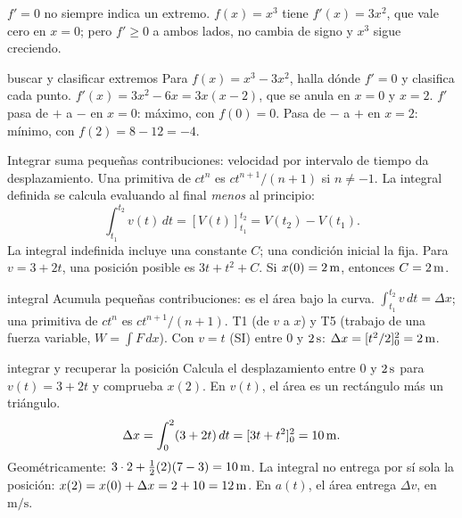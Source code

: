 \documentclass[11pt,a4paper]{article}
\begin{document}
\begin{warnbox}
$f'=0$ no siempre indica un extremo. $f(x)=x^3$ tiene $f'(x)=3x^2$, que vale cero en
$x=0$; pero $f'\ge0$ a ambos lados, no cambia de signo y $x^3$ sigue creciendo.
\end{warnbox}

\begin{exercisebox}{buscar y clasificar extremos}
Para $f(x)=x^3-3x^2$, halla d\'onde $f'=0$ y clasifica cada punto.
\solutionblock
$f'(x)=3x^2-6x=3x(x-2)$, que se anula en $x=0$ y $x=2$.
$f'$ pasa de $+$ a $-$ en $x=0$: m\'aximo, con $f(0)=0$.
Pasa de $-$ a $+$ en $x=2$: m\'inimo, con $f(2)=8-12=-4$.
\end{exercisebox}

Integrar suma peque\~nas contribuciones: velocidad por intervalo de tiempo da
desplazamiento. Una primitiva de $ct^n$ es $ct^{n+1}/(n+1)$ si $n\ne-1$.
La integral definida se calcula evaluando al final \emph{menos} al principio:
\[
\int_{t_1}^{t_2}v(t)\,dt=[V(t)]_{t_1}^{t_2}=V(t_2)-V(t_1).
\]
La integral indefinida incluye una constante $C$; una condici\'on inicial la fija.
Para $v=3+2t$, una posici\'on posible es $3t+t^2+C$.
Si $x(0)=2\,\mathrm{m}$, entonces $C=2\,\mathrm{m}$.

\begin{toolbox}{integral}
 Acumula peque\~nas contribuciones: es el \'area bajo la curva.
 $\int_{t_1}^{t_2}v\,dt=\Delta x$; una primitiva de $ct^n$ es
$ct^{n+1}/(n+1)$.
 T1 (de $v$ a $x$) y T5 (trabajo de una fuerza variable,
$W=\int F\,dx$).
 Con $v=t$ (SI) entre $0$ y $2\,\mathrm{s}$: $\Delta x=[t^2/2]_0^2=2\,\mathrm{m}$.
\end{toolbox}

\begin{examplebox}{integrar y recuperar la posici\'on}
 Calcula el desplazamiento entre $0$ y $2\,\mathrm{s}$ para
$v(t)=3+2t$ y comprueba $x(2)$.
\solutionblock
{} En $v(t)$, el \'area es un rect\'angulo m\'as un tri\'angulo.
\[
\Delta x=\int_0^2(3+2t)\,dt=[3t+t^2]_0^2=10\,\mathrm{m}.
\]
Geom\'etricamente: $3\cdot2+\tfrac12(2)(7-3)=10\,\mathrm{m}$.
 La integral no entrega por s\'i sola la posici\'on:
$x(2)=x(0)+\Delta x=2+10=12\,\mathrm{m}$.
En $a(t)$, el \'area entrega $\Delta v$, en $\mathrm{m/s}$.
\end{examplebox}
\end{document}
